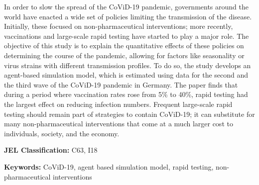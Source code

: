 \noindent
In order to slow the spread of the CoViD-19 pandemic, governments around the world have
enacted a wide set of policies limiting the transmission of the disease. Initially,
these focused on non-pharmaceutical interventions; more recently, vaccinations and
large-scale rapid testing have started to play a major role. The objective of this study
is to explain the quantitative effects of these policies on determining the course of
the pandemic, allowing for factors like seasonality or virus strains with different
transmission profiles. To do so, the study develops an agent-based simulation model,
which is estimated using data for the second and the third wave of the CoViD-19 pandemic
in Germany. The paper finds that during a period where vaccination rates rose from 5\%
to 40\%, rapid testing had the largest effect on reducing infection numbers. Frequent
large-scale rapid testing should remain part of strategies to contain CoViD-19; it can
substitute for many non-pharmaceutical interventions that come at a much larger cost to
individuals, society, and the economy.

\vspace{1cm}
\noindent \textbf{JEL Classification:} C63, I18

\noindent \textbf{Keywords:} CoViD-19, agent based simulation model, rapid testing,
non-pharmaceutical interventions